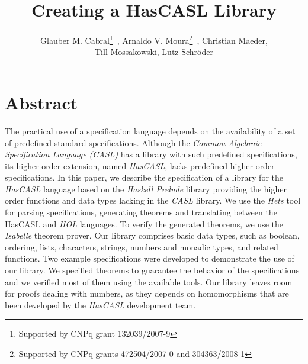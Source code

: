 \documentclass[12pt]{article}
\title{Creating a HasCASL Library}
\author{Glauber M. Cabral\inst{1}\thanks{Supported by CNPq grant 132039/2007-9}\ , Arnaldo V. Moura\inst{1}\thanks{Supported by CNPq grants 472504/2007-0 and 304363/2008-1}\ , Christian Maeder\inst{2},\\ Till Mossakowski\inst{2}, Lutz Schr\"oder\inst{2} }
\begin{document}
\maketitle

\section*{Abstract}
	
The practical use of a specification language depends on the availability of a set of predefined standard specifications. Although the \textit{Common Algebraic Specification Language (CASL)} has a library with such predefined specifications, its higher order extension, named \textit{HasCASL}, lacks predefined higher order specifications. In this paper, we describe the specification of a library for the \textit{HasCASL} language based on the \textit{Haskell Prelude} library providing the higher order functions and data types lacking in the \textit{CASL} library. We use the \textit{Hets} tool for parsing specifications, generating theorems and translating between the HasCASL and \textit{HOL} languages. To verify the generated theorems, we use the \textit{Isabelle} theorem prover. Our library comprises basic data types, such as boolean, ordering, lists, characters, strings, numbers and monadic types, and related functions. Two example specifications were developed to demonstrate the use of our library. We specified theorems to guarantee the behavior of the specifications and we verified most of them using the available tools. Our library leaves room for proofs dealing with numbers, as they depends on homomorphisms that are been developed by the \textit{HasCASL} development team.
\end{document}
